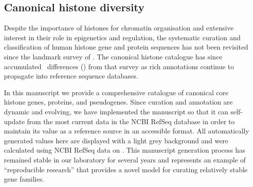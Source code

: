  \subsection{Canonical histone diversity}

    Despite the importance of histones for chromatin organisation and extensive interest
    in their role in epigenetics and regulation, the systematic
    curation and classification of human histone
    gene and protein sequences has not been revisited
    since the landmark survey of \citet{Marzluff02}.
    The canonical histone catalogue has since accumulated
    \TotalChangesSinceReference{}~differences ()
    from that survey as rich annotations continue to propagate
    into reference sequence databases.

    In this manuscript we provide a comprehensive catalogue
    of canonical core histone genes, proteins, and pseudogenes.
    Since curation and annotation are dynamic and evolving,
    we have implemented the manuscript so that it can
    self-update from the most current data in the NCBI RefSeq database
    in order to maintain its value as a reference source in an accessible format.
    All automatically generated values here are displayed with a light grey background
    and were calculated using NCBI RefSeq data on \printdate{\SequencesDate{}}.
    This manuscript generation process has remained stable in our laboratory for several years
    and represents an example of ``reproducible research'' \citep{Claerbout2000}
    that provides a novel model for curating relatively stable gene families.
